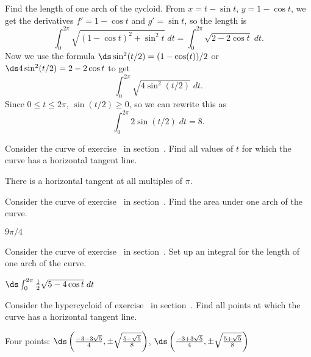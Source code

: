 \begin{example} Find the length of one arch of the cycloid.
From $x=t-\sin t$, $y=1-\cos t$, we get the derivatives
$f'=1-\cos t$ and $g'=\sin t$, so the length is 
$$
  \int_0^{2\pi} \sqrt{(1-\cos t)^2+\sin^2 t}\;dt=
  \int_0^{2\pi} \sqrt{2-2\cos t}\;dt.
$$
Now we use the formula $\ds \sin^2(t/2)=(1-\cos(t))/2$ or
$\ds 4\sin^2(t/2)=2-2\cos t$ to get
$$\int_0^{2\pi} \sqrt{4\sin^2(t/2)}\;dt.$$
Since $0\le t\le2\pi$, $\sin(t/2)\ge 0$, so we can rewrite this as
$$\int_0^{2\pi} 2\sin(t/2)\;dt = 8.$$
\end{example}

\begin{exercises}

\begin{exercise} Consider the curve of 
exercise~ in 
section~. Find all values of
$t$ for which the curve has a horizontal tangent line.
\begin{answer} There is a horizontal tangent at all multiples of $\pi$.
\end{answer}\end{exercise}

\begin{exercise} Consider the curve of 
exercise~ in 
section~. Find the area under
one arch of the curve.
\begin{answer} $9\pi/4$
\end{answer}\end{exercise}

\begin{exercise} Consider the curve of 
exercise~ in 
section~. Set up an integral
for the length of one arch of the curve.
\begin{answer} $\ds \int_0^{2\pi}{1\over2} \sqrt{5-4\cos t}\;dt$
\end{answer}\end{exercise}

\begin{exercise} Consider the hypercycloid of 
exercise~ in 
section~. Find all points at
which the curve has a horizontal tangent line.
\begin{answer} Four points:\hfill\break
$\ds \left({-3-3\sqrt5\over4},
\pm\sqrt{5-\sqrt5\over8}\right)$,\hfill\break
$\ds \left({-3+3\sqrt5\over4},
\pm\sqrt{5+\sqrt5\over8}\right)$ 
\end{answer}\end{exercise}


\end{exercises}
